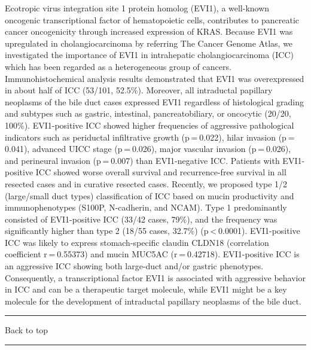 \documentclass[]{article}
\begin{document}
Ecotropic virus integration site 1 protein homolog (EVI1), a well-known
oncogenic transcriptional factor of hematopoietic cells, contributes to
pancreatic cancer oncogenicity through increased expression of KRAS.
Because EVI1 was upregulated in cholangiocarcinoma by referring The
Cancer Genome Atlas, we investigated the importance of EVI1 in
intrahepatic cholangiocarcinoma (ICC) which has been regarded as a
heterogeneous group of cancers. Immunohistochemical analysis results
demonstrated that EVI1 was overexpressed in about half of ICC (53/101,
52.5\%). Moreover, all intraductal papillary neoplasms of the bile duct
cases expressed EVI1 regardless of histological grading and subtypes
such as gastric, intestinal, pancreatobiliary, or oncocytic (20/20,
100\%). EVI1-positive ICC showed higher frequencies of aggressive
pathological indicators such as periductal infiltrative growth
(p = 0.022), hilar invasion (p = 0.041), advanced UICC stage
(p = 0.026), major vascular invasion (p = 0.026), and perineural
invasion (p = 0.007) than EVI1-negative ICC. Patients with EVI1-positive
ICC showed worse overall survival and recurrence-free survival in all
resected cases and in curative resected cases. Recently, we proposed
type 1/2 (large/small duct types) classification of ICC based on mucin
productivity and immunophenotypes (S100P, N-cadherin, and NCAM). Type 1
predominantly consisted of EVI1-positive ICC (33/42 cases, 79\%), and
the frequency was significantly higher than type 2 (18/55 cases, 32.7\%)
(p \textless{} 0.0001). EVI1-positive ICC was likely to express
stomach-specific claudin CLDN18 (correlation coefficient r = 0.55373)
and mucin MUC5AC (r = 0.42718). EVI1-positive ICC is an aggressive ICC
showing both large-duct and/or gastric phenotypes. Consequently, a
transcriptional factor EVI1 is associated with aggressive behavior in
ICC and can be a therapeutic target molecule, while EVI1 might be a key
molecule for the development of intraductal papillary neoplasms of the
bile duct.

{}

{}

\begin{center}\rule{0.5\linewidth}{\linethickness}\end{center}

Back to top

\begin{center}\rule{0.5\linewidth}{\linethickness}\end{center}

\pagebreak
\end{document}

